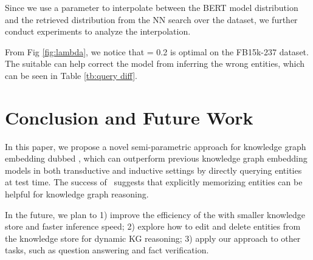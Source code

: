 \documentclass[runningheads]{llncs}
\begin{document}
Since we use a parameter  to interpolate between the BERT model distribution and the retrieved distribution from the NN search over the dataset, we further conduct experiments to analyze the interpolation.

From Fig \ref{fig:lambda}, we notice that  = 0.2 is optimal on the FB15k-237 dataset. 
The suitable  can help correct the model from inferring the wrong entities, which can be seen in Table \ref{tb:query diff}.








 








\section{Conclusion and Future Work}

In this paper, we propose a novel semi-parametric approach for knowledge graph embedding dubbed {\ours}, which can outperform previous knowledge graph embedding models in both transductive and inductive settings by directly querying entities at test time. 
The success of \ours~suggests that explicitly memorizing entities can be helpful for knowledge graph reasoning\cite{qiao2023reasoning,zhang2023multimodal}. 


In the future, we plan to
1) improve the efficiency of the {\ours} with smaller knowledge store and faster inference speed;
2) explore how to edit\cite{yao2023editing} and delete entities from the knowledge store for dynamic KG reasoning;
3)  apply our approach to other tasks, such as question answering and fact verification.


 



\appendix








































\end{document}
